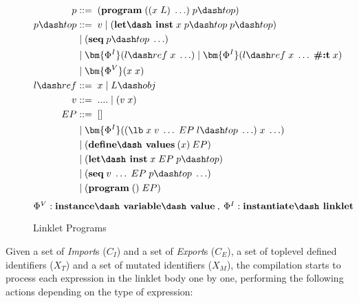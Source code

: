 \begin{figure}[h]
  \begin{mdframed}
    \begin{align*}
      p           &::=\; (\textbf{program}\; ((x\; L)\; \ldots)\; p\dash top) \\
      p\dash top  &::=\; v\; |\; (\textbf{let\dash inst}\; x\; p\dash top\;p\dash top) \\
      \;          &\;|\; (\textbf{seq}\; p\dash top\; \ldots) \\
      \;          &\;|\; \bm{\Phi^I}(l\dash ref\; x\; \ldots)\; |\; \bm{\Phi^I}(l\dash ref\; x\; \ldots\; \textbf{\#:t}\; x) \\
      \;          &\;|\; \bm{\Phi^V}(x\; x) \\
      l\dash ref &::=\; x\; |\; L\dash obj \\
      v           &::=\; ....\;|\;(v\;x) \\
      EP          &::=\; [] \\
      \;          &\;|\; \bm{\Phi^I}((\lb\; x\; v\; \ldots\; EP\; l\dash top\; \ldots)\; x\; \ldots) \\
      \;          &\;|\; (\textbf{define\dash values}\:(x)\:EP) \\
      \;          &\;|\; (\textbf{let\dash inst}\; x\; EP\; p\dash top) \\
      \;          &\;|\; (\textbf{seq}\; v\; \ldots\; EP\; p\dash top\; \ldots) \\
      \;          &\;|\; (\textbf{program}\; ()\; EP) \\
    \end{align*}
    \hfill \footnotesize $\Phi^V : \textbf{instance\dash variable\dash value}\:,\: \Phi^I : \textbf{instantiate\dash linklet}$
    \caption{Linklet Programs}
    \label{fig:linklet-program}
  \end{mdframed}
\end{figure}

Given a set of \textit{Import}s ($\mathit{C_I}$) and a set of
\textit{Export}s ($\mathit{C_E}$), a set of toplevel defined
identifiers ($\mathit{X_T}$) and a set of mutated identifiers
($\mathit{X_M}$), the compilation starts to process each expression in
the linklet body one by one, performing the following actions
depending on the type of expression:


